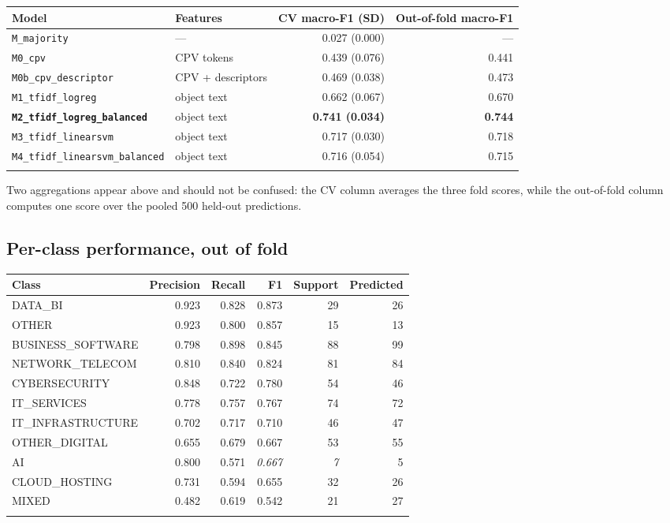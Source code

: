 \begingroup
\small
\setlength{\tabcolsep}{4pt}
\begin{longtable}[]{@{}llrr@{}}
\toprule\noalign{}
Model & Features & CV macro-F1 (SD) & Out-of-fold macro-F1 \\
\midrule\noalign{}
\endhead
\texttt{M\_majority} & --- & 0.027 (0.000) & --- \\
\texttt{M0\_cpv} & CPV tokens & 0.439 (0.076) & 0.441 \\
\texttt{M0b\_cpv\_descriptor} & CPV + descriptors & 0.469 (0.038) & 0.473 \\
\texttt{M1\_tfidf\_logreg} & object text & 0.662 (0.067) & 0.670 \\
\textbf{\texttt{M2\_tfidf\_logreg\_balanced}} & object text & \textbf{0.741 (0.034)} & \textbf{0.744} \\
\texttt{M3\_tfidf\_linearsvm} & object text & 0.717 (0.030) & 0.718 \\
\texttt{M4\_tfidf\_linearsvm\_balanced} & object text & 0.716 (0.054) & 0.715 \\
\bottomrule\noalign{}
\end{longtable}
\endgroup

Two aggregations appear above and should not be confused: the CV column averages the three fold scores, while
the out-of-fold column computes one score over the pooled 500 held-out predictions.

\subsection*{Per-class performance, out of fold}

\begin{longtable}[]{@{}lrrrrr@{}}
\toprule\noalign{}
Class & Precision & Recall & F1 & Support & Predicted \\
\midrule\noalign{}
\endhead
DATA\_BI & 0.923 & 0.828 & 0.873 & 29 & 26 \\
OTHER & 0.923 & 0.800 & 0.857 & 15 & 13 \\
BUSINESS\_SOFTWARE & 0.798 & 0.898 & 0.845 & 88 & 99 \\
NETWORK\_TELECOM & 0.810 & 0.840 & 0.824 & 81 & 84 \\
CYBERSECURITY & 0.848 & 0.722 & 0.780 & 54 & 46 \\
IT\_SERVICES & 0.778 & 0.757 & 0.767 & 74 & 72 \\
IT\_INFRASTRUCTURE & 0.702 & 0.717 & 0.710 & 46 & 47 \\
OTHER\_DIGITAL & 0.655 & 0.679 & 0.667 & 53 & 55 \\
AI & 0.800 & 0.571 & \emph{0.667} & \emph{7} & 5 \\
CLOUD\_HOSTING & 0.731 & 0.594 & 0.655 & 32 & 26 \\
MIXED & 0.482 & 0.619 & 0.542 & 21 & 27 \\
\bottomrule\noalign{}
\end{longtable}

